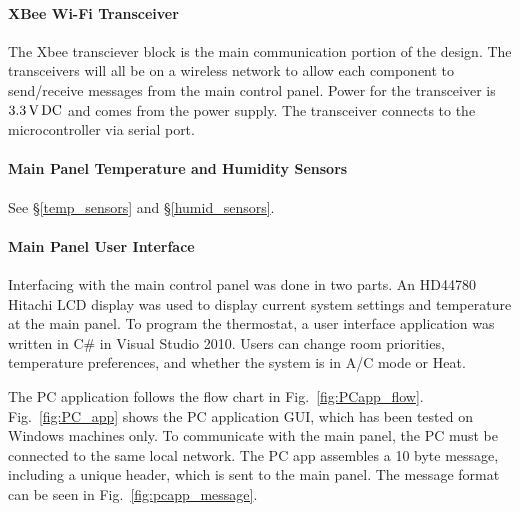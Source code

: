 \paragraph{XBee Wi-Fi Transceiver}
The Xbee transciever block is the main communication portion of the design. The transceivers will all be on a wireless network to allow each component to send/receive messages from the main control panel. Power for the transceiver is $3.3\mbox{\,V\,DC}$ and comes from the power supply. The transceiver connects to the microcontroller via serial port.

\paragraph{Main Panel Temperature and Humidity Sensors}
See \S\ref{temp_sensors} and \S\ref{humid_sensors}.

\paragraph{Main Panel User Interface}
Interfacing with the main control panel was done in two parts. An HD44780 Hitachi LCD display was used to display current system settings and temperature at the main panel. To program the thermostat, a user interface application was written in C\# in Visual Studio 2010. Users can change room priorities, temperature preferences, and whether the system is in A/C mode or Heat. 

The PC application follows the flow chart in Fig.~\ref{fig:PCapp_flow}. Fig.~\ref{fig:PC_app} shows the PC application GUI, which has been tested on Windows machines only.  To communicate with the main panel, the PC must be connected to the same local network.  The PC app assembles a 10 byte message, including a unique header, which is sent to the main panel.  The message format can be seen in Fig.~\ref{fig:pcapp_message}.

